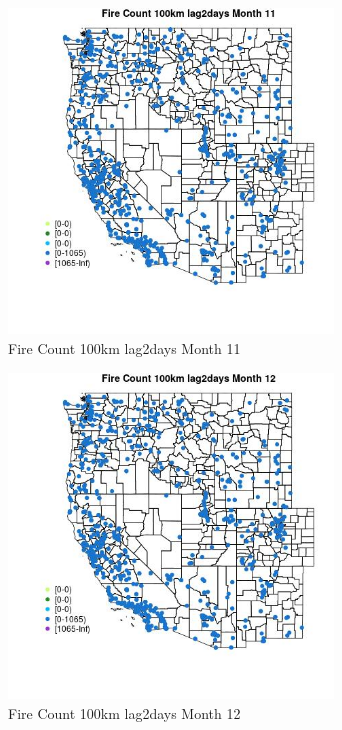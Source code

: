 \begin{figure} 
\centering  
\includegraphics[width=0.77\textwidth]{Code_Outputs/Report_ML_input_PM25_Step4_part_f_de_duplicated_aves_prioritize_24hr_obswNAs_MapObsMo11Fire_Count_100km_lag2days.jpg} 
\caption{\label{fig:Report_ML_input_PM25_Step4_part_f_de_duplicated_aves_prioritize_24hr_obswNAsMapObsMo11Fire_Count_100km_lag2days}Fire Count 100km lag2days Month 11} 
\end{figure} 
 

\begin{figure} 
\centering  
\includegraphics[width=0.77\textwidth]{Code_Outputs/Report_ML_input_PM25_Step4_part_f_de_duplicated_aves_prioritize_24hr_obswNAs_MapObsMo12Fire_Count_100km_lag2days.jpg} 
\caption{\label{fig:Report_ML_input_PM25_Step4_part_f_de_duplicated_aves_prioritize_24hr_obswNAsMapObsMo12Fire_Count_100km_lag2days}Fire Count 100km lag2days Month 12} 
\end{figure} 
 

